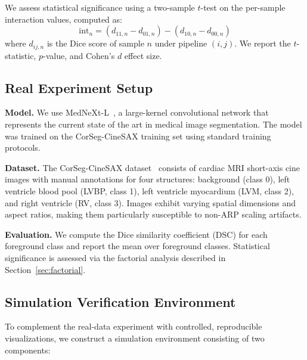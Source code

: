 \documentclass[10pt,twocolumn]{article}
\begin{document}
We assess statistical significance using a two-sample $t$-test on the per-sample interaction values, computed as:
\begin{equation}
    \text{int}_n = (d_{11,n} - d_{01,n}) - (d_{10,n} - d_{00,n})
\end{equation}
where $d_{ij,n}$ is the Dice score of sample $n$ under pipeline $(i,j)$.
We report the $t$-statistic, $p$-value, and Cohen's $d$ effect size.

\subsection{Real Experiment Setup}
\label{sec:real_setup}

\textbf{Model.}
We use MedNeXt-L~\cite{roy2023mednext}, a large-kernel convolutional network that represents the current state of the art in medical image segmentation.
The model was trained on the CorSeg-CineSAX training set using standard training protocols.

\textbf{Dataset.}
The CorSeg-CineSAX dataset~\cite{corseg2023} consists of cardiac MRI short-axis cine images with manual annotations for four structures: background (class 0), left ventricle blood pool (LVBP, class 1), left ventricle myocardium (LVM, class 2), and right ventricle (RV, class 3).
Images exhibit varying spatial dimensions and aspect ratios, making them particularly susceptible to non-ARP scaling artifacts.

\textbf{Evaluation.}
We compute the Dice similarity coefficient (DSC) for each foreground class and report the mean over foreground classes.
Statistical significance is assessed via the factorial analysis described in Section~\ref{sec:factorial}.

\subsection{Simulation Verification Environment}
\label{sec:sim_setup}

To complement the real-data experiment with controlled, reproducible visualizations, we construct a simulation environment consisting of two components:
\end{document}
